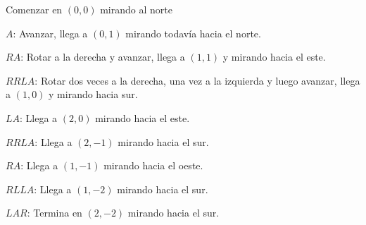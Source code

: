 \documentclass{oci}
\begin{document}
\begin{minipage}{0.45\textwidth}
\begin{itemize}
	{\footnotesize \item Comenzar en $(0,0)$ mirando al norte
	\item $A$:  Avanzar, llega a $(0,1)$ mirando todavía hacia el norte.
	\item $RA$: Rotar a la derecha y avanzar, llega a $(1,1)$ y mirando hacia el este.
	\item $RRLA$: Rotar dos veces a la derecha, una vez a la izquierda y luego avanzar, llega a $(1,0)$ y mirando hacia sur.
	\item $LA$: Llega a $(2,0)$ mirando hacia el este.
	\item $RRLA$: Llega a $(2,-1)$ mirando hacia el sur.
	\item $RA$: Llega a $(1,-1)$ mirando hacia el oeste.
	\item $RLLA$: Llega a $(1,-2)$ mirando hacia el sur.
	\item $LAR$:  Termina en $(2,-2)$ mirando hacia el sur.}
\end{itemize}
\end{minipage}
~%
\end{document}
